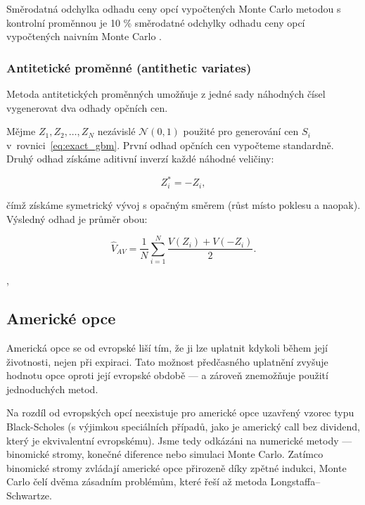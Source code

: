 \documentclass{article}
\begin{document}
Směrodatná odchylka odhadu ceny opcí vypočtených Monte Carlo metodou s kontrolní proměnnou je 10 \% směrodatné odchylky odhadu ceny opcí vypočtených naivním Monte Carlo \citep[Kapitola~24.5]{McDonald2013}.

\subsubsection{Antitetické proměnné (antithetic variates)}

Metoda antitetických proměnných umožňuje z jedné sady náhodných čísel vygenerovat dva odhady opčních cen.

Mějme $Z_1, Z_2, \dots, Z_N$ nezávislé $\mathcal{N}(0,1)$ použité pro generování cen $S_i$ v~rovnici~\eqref{eq:exact_gbm}. První odhad opčních cen vypočteme standardně. Druhý odhad získáme aditivní inverzí každé náhodné veličiny:

\begin{equation}
  Z_i^* = -Z_i,
\end{equation}

čímž získáme symetrický vývoj s opačným směrem (růst místo poklesu a naopak). Výsledný odhad je průměr obou:

\begin{equation}
  \hat{V}_{AV} = \frac{1}{N} \sum_{i=1}^N \frac{V(Z_i) + V(-Z_i)}{2}.
\end{equation}

\citep[Kapitola~24.5]{McDonald2013}, \citep[Kapitola~4.2]{Glasserman2004} 

\subsection{Americké opce}

Americká opce se od evropské liší tím, že ji lze uplatnit kdykoli během její životnosti, nejen při expiraci. Tato možnost předčasného uplatnění zvyšuje hodnotu opce oproti její evropské obdobě — a zároveň znemožňuje použití jednoduchých metod.

Na rozdíl od evropských opcí neexistuje pro americké opce uzavřený vzorec typu Black-Scholes (s výjimkou speciálních případů, jako je americký call bez dividend, který je ekvivalentní evropskému). Jsme tedy odkázáni na numerické metody — binomické stromy, konečné diference nebo simulaci Monte Carlo. Zatímco binomické stromy zvládají americké opce přirozeně díky zpětné indukci, Monte Carlo čelí dvěma zásadním problémům, které řeší až metoda Longstaffa–Schwartze.
\end{document}
